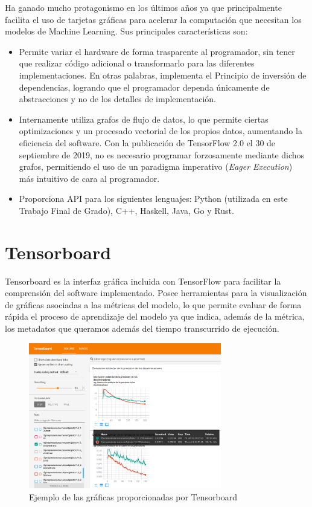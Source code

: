 \documentclass[../main.tex]{subfiles}
\begin{document}
Ha ganado mucho protagonismo en los últimos años ya que principalmente facilita el uso de tarjetas gráficas para acelerar la computación que necesitan los modelos de Machine Learning. Sus principales características son:
\begin{itemize}
    \item Permite variar el hardware de forma trasparente al programador, sin tener que realizar código adicional o transformarlo para las diferentes implementaciones. En otras palabras, implementa el Principio de inversión de dependencias, logrando que el programador dependa únicamente de abstracciones y no de los detalles de implementación.
    \item Internamente utiliza grafos de flujo de datos, lo que permite ciertas optimizaciones y un procesado vectorial de los propios datos, aumentando la eficiencia del software. Con la publicación de TensorFlow 2.0 el 30 de septiembre de 2019, no es necesario programar forzosamente mediante dichos grafos, permitiendo el uso de un paradigma imperativo (\textit{Eager Execution}) más intuitivo de cara al programador.
    \item Proporciona API para los siguientes lenguajes: Python (utilizada en este Trabajo Final de Grado), C++, Haskell, Java, Go y Rust.
\end{itemize}

\section{Tensorboard}
Tensorboard es la interfaz gráfica incluida con TensorFlow para facilitar la comprensión del software implementado. Posee herramientas para la visualización de gráficas asociadas a las métricas del modelo, lo que permite evaluar de forma rápida el proceso de aprendizaje del modelo ya que indica, además de la métrica, los metadatos que queramos además del tiempo transcurrido de ejecución. \newline

\begin{figure}[h!]
    \centering
    \includegraphics[width=0.75\textwidth]{imagenes/Tensorboard_graficas.png}
    \caption{Ejemplo de las gráficas proporcionadas por Tensorboard}
    \label{fig:tensorboard_descripcion_graficas}
\end{figure}
\end{document}
